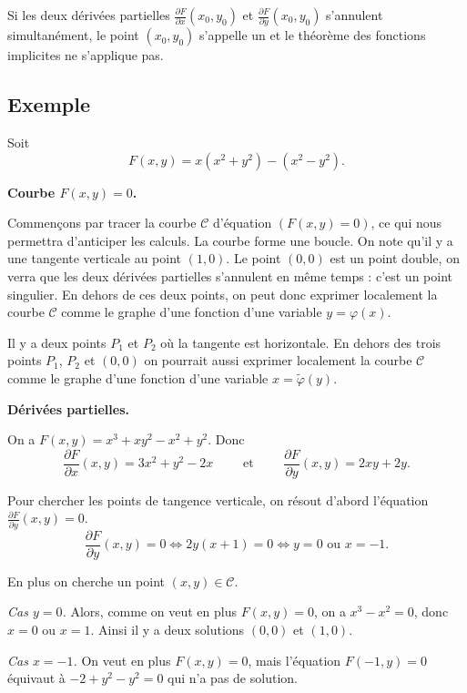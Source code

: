 \documentclass[11pt, class=report,crop=false]{standalone}
\begin{document}
Si les deux dérivées partielles $\frac{\partial F}{\partial x}(x_0,y_0)$ et $\frac{\partial F}{\partial y}(x_0,y_0)$ s'annulent simultanément, le point $(x_0,y_0)$ s'appelle un  et le théorème des fonctions implicites ne s'applique pas.

\subsection{Exemple}

Soit 
$$F(x,y) = x(x^2+y^2)-(x^2-y^2).$$

\textbf{Courbe $F(x,y)=0$.}

Commençons par tracer la courbe $\mathcal{C}$ d'équation $(F(x,y)=0)$, ce qui nous permettra d'anticiper les calculs.
La courbe forme une boucle. On note qu'il y a une tangente verticale au point $(1,0)$.
Le point $(0,0)$ est un point double, on verra que les deux dérivées partielles s'annulent en même temps : c'est un point singulier. En dehors de ces deux points, on peut donc exprimer localement la courbe $\mathcal{C}$ comme le graphe d'une fonction d'une variable $y = \varphi(x)$.




Il y a deux points $P_1$ et $P_2$ où la tangente est horizontale. En dehors des trois points $P_1$, $P_2$ et $(0,0)$ on pourrait aussi exprimer localement la courbe $\mathcal{C}$ comme le graphe d'une fonction d'une variable $x = \tilde\varphi(y)$.

\bigskip

\textbf{Dérivées partielles.}

On a $F(x,y) = x^3 + xy^2 -x^2+y^2$. Donc
$$\frac{\partial F}{\partial x}(x,y) = 3x^2+y^2-2x 
\qquad \text{ et } \qquad 
\frac{\partial F}{\partial y}(x,y) = 2xy+2y.$$

Pour chercher les points de tangence verticale, on résout d'abord l'équation $\frac{\partial F}{\partial y}(x,y) = 0$.
$$\frac{\partial F}{\partial y}(x,y) = 0 \iff  2y(x+1)=0 \iff y=0 \text{ ou } x=-1.$$

En plus on cherche un point $(x,y) \in \mathcal{C}$.

\emph{Cas $y=0$.} Alors, comme on veut en plus $F(x,y)=0$, on a $x^3-x^2=0$, donc $x=0$ ou $x=1$.
Ainsi il y a deux solutions $(0,0)$ et $(1,0)$.

\emph{Cas $x=-1$.} On veut en plus $F(x,y)=0$, mais l'équation $F(-1,y)=0$ équivaut à 
$-2+y^2-y^2=0$ qui n'a pas de solution.
\end{document}

